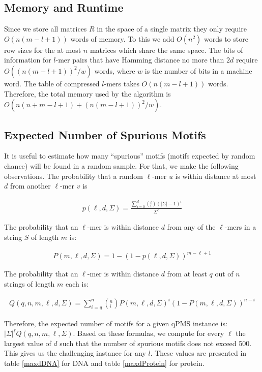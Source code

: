 \subsection{Memory and Runtime}
Since we store all matrices $R$ in the space of a single matrix they
only require $O(n(m-l+1))$ words of memory. To this we add $O(n^2)$ words to store
 row sizes for the at most $n$ matrices which share the same space.
 The bits of information for $l$-mer pairs that have Hamming distance no
 more than $2d$ require $O((n(m-l+1))^2/w)$ words, where $w$ is the number of
 bits in a machine word.
The table of compressed $l$-mers takes $O(n(m-l+1))$ words. Therefore, the
total memory used by the algorithm is $O(n(n+m-l+1) + (n(m-l+1))^2 / w)$.

\subsection{Expected Number of Spurious Motifs}

It is useful to estimate how many ``spurious'' motifs (motifs expected by random
chance) will be found in a random sample. For that, we make the following
observations. The probability that a random $\ell$-mer $u$ is within distance
at most $d$ from another $\ell$-mer $v$ is

\begin{align}
p(\ell,d,\Sigma)=\frac{\sum_{i=0}^d\left(^\ell_i\right)(|\Sigma|-1)^i}{\Sigma^\ell}
\end{align}

The probability that an $\ell$-mer is within distance $d$ from any of the
$\ell$-mers in a string $S$ of length $m$ is: 

\begin{align}
P(m, \ell, d, \Sigma) = 1-(1-p(\ell,d,\Sigma))^{m-\ell+1}
\end{align}

The probability that an $\ell$-mer is within distance $d$ from at least
$q$ out of $n$ strings of length $m$ each is:

\begin{align}
Q(q,n,m,\ell,d,\Sigma)=\sum_{i=q}^n\left(^n_i\right)P(m,\ell,d,\Sigma)^i(1-P(m,\ell,d,\Sigma))^{n-i}
\end{align}

Therefore, the expected number of motifs for a given qPMS instance is:
$|\Sigma|^\ell Q(q,n,m,\ell,\Sigma)$. Based on
these formulas, we compute for every $\ell$ the largest value of $d$
such that the number of spurious motifs does not exceed 500. This gives us
the challenging instance for any $l$. These values are presented in table
\ref{maxdDNA} for DNA and table \ref{maxdProtein} for protein.

